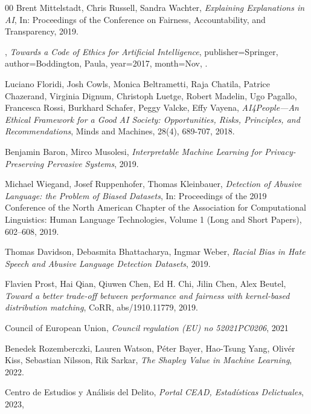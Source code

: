 \documentclass[fleqn,10pt]{wlscirep}
\begin{document}
\begin{thebibliography}{00}
  Brent Mittelstadt, Chris Russell, Sandra Wachter,
  \textit{Explaining Explanations in {AI}},
  In: Proceedings of the Conference on Fairness, Accountability, and Transparency,
  2019.


  ,
  \textit{Towards a Code of Ethics for Artificial Intelligence}, publisher={Springer}, author={Boddington, Paula}, year={2017}, month={Nov},
  .


  Luciano Floridi, Josh Cowls, Monica Beltrametti, Raja Chatila, Patrice Chazerand, Virginia Dignum, Christoph Luetge, Robert Madelin, Ugo Pagallo, Francesca Rossi, Burkhard Schafer, Peggy Valcke, Effy Vayena,
  \textit{AI4People---An Ethical Framework for a Good AI Society: Opportunities, Risks, Principles, and Recommendations},
  Minds and Machines,
  28(4),
  689-707,
  2018.


  Benjamin Baron, Mirco Musolesi,
  \textit{Interpretable Machine Learning for Privacy-Preserving Pervasive Systems},
  2019.


  Michael Wiegand, Josef Ruppenhofer, Thomas Kleinbauer,
  \textit{{D}etection of {A}busive {L}anguage: the {P}roblem of {B}iased {D}atasets},
  In: Proceedings of the 2019 Conference of the North {A}merican Chapter of the Association for Computational Linguistics: Human Language Technologies, Volume 1 (Long and Short Papers),
  602--608,
  2019.


  Thomas Davidson, Debasmita Bhattacharya, Ingmar Weber,
  \textit{Racial Bias in Hate Speech and Abusive Language Detection Datasets},
  2019.


  Flavien Prost, Hai Qian, Qiuwen Chen, Ed H. Chi, Jilin Chen, Alex Beutel,
  \textit{Toward a better trade-off between performance and fairness with kernel-based distribution matching},
  CoRR,
  abs/1910.11779,
  2019.


  {Council of European Union},
  \textit{Council regulation ({EU}) no 52021PC0206},
  {2021}   %


  Benedek Rozemberczki, Lauren Watson, Péter Bayer, Hao-Tsung Yang, Olivér Kiss, Sebastian Nilsson, Rik Sarkar,
  \textit{The Shapley Value in Machine Learning},
  2022.


  {Centro de Estudios y Análisis del Delito},
  \textit{Portal CEAD, Estadísticas Delictuales},
  {2023},   %



\end{thebibliography}
\end{document}
